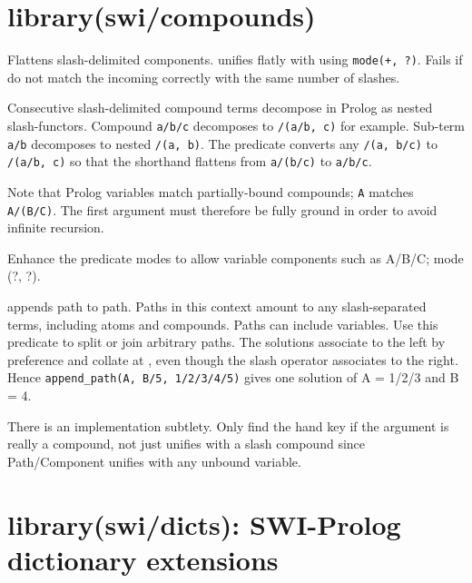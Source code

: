 \chapter{library(swi/compounds)}\label{sec:compounds}

\begin{description}
Flattens slash-delimited components.  unifies flatly with
 using \verb$mode(+, ?)$. Fails if  do not match the
incoming  correctly with the same number of slashes.

Consecutive slash-delimited compound terms decompose in Prolog as
nested slash-functors. Compound \verb$a/b/c$ decomposes to \verb$/(a/b, c)$
for example. Sub-term \verb$a/b$ decomposes to nested \verb$/(a, b)$. The
predicate converts any \verb$/(a, b/c)$ to \verb$/(a/b, c)$ so that the
shorthand flattens from \verb$a/(b/c)$ to \verb$a/b/c$.

Note that Prolog variables match partially-bound compounds; \verb$A$
matches \verb$A/(B/C)$. The first argument must therefore be fully ground
in order to avoid infinite recursion.

\begin{tags}
Enhance the predicate modes to allow variable components such
as A/B/C; mode (?, ?).
\end{tags}

 appends  path to  path. Paths in this context
amount to any slash-separated terms, including atoms and compounds.
Paths can include variables. Use this predicate to split or join
arbitrary paths. The solutions associate to the left by preference
and collate at , even though the slash operator associates to
the right. Hence \verb$append_path(A, B/5, 1/2/3/4/5)$ gives one solution
of A = 1/2/3 and B = 4.

There is an implementation subtlety. Only find the  hand key if
the argument is really a compound, not just unifies with a slash
compound since Path/Component unifies with any unbound variable.
\end{description}

\chapter{library(swi/dicts): SWI-Prolog dictionary extensions}\label{sec:dicts}

